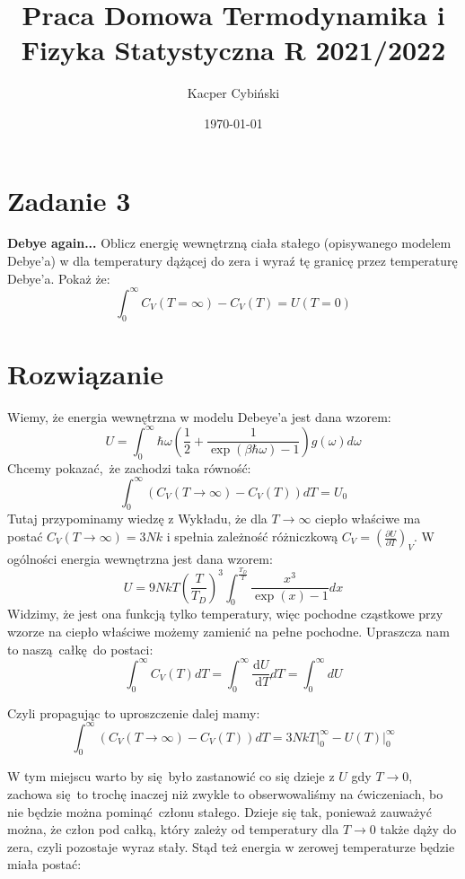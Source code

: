 \documentclass[12pt,a4paper]{article}
\title{Praca Domowa Termodynamika i Fizyka Statystyczna R 2021/2022}
\author{Kacper Cybiński}
\date{\today}
\renewcommand{\emph}{\textbf}
\begin{document}
\maketitle

\section{Zadanie 3}

\emph{Debye again...} Oblicz energię wewnętrzną ciała stałego (opisywanego modelem Debye'a) w dla temperatury dążącej do zera i wyraź tę granicę przez temperaturę Debye'a. Pokaż że:
$$
\int_{0}^{\infty} C_{V}(T=\infty)-C_{V}(T)=U(T=0)
$$

\section{Rozwiązanie}

Wiemy, że energia wewnętrzna w modelu Debeye'a jest dana wzorem:
$$
U=\int_{0}^{\infty} \hbar \omega\left(\frac{1}{2}+\frac{1}{\exp (\beta \hbar \omega)-1}\right) g(\omega) d \omega
$$
Chcemy pokazać, że zachodzi taka równość:
$$
\int_{0}^{\infty}\left(C_{V}(T \rightarrow \infty)-C_{V}(T)\right) d T=U_{0}
$$
Tutaj przypominamy wiedzę z Wykładu, że dla $T \rightarrow \infty$ ciepło właściwe ma postać 
$
C_{V}(T \rightarrow \infty)=3 N k
$ i spełnia zależność różniczkową 
$
C_{V}=\left(\frac{\partial U}{\partial T}\right)_{V}
$.
W ogólności energia wewnętrzna jest dana wzorem:
$$
U=9 N k T\left(\frac{T}{T_{D}}\right)^{3} \int_{0}^{\frac{T_{D}}{T}} \frac{x^{3}}{\exp (x)-1} d x
$$
Widzimy, że jest ona funkcją tylko temperatury, więc pochodne cząstkowe przy wzorze na ciepło właściwe możemy zamienić na pełne pochodne. Upraszcza nam to naszą całkę do postaci:
$$
\int_{0}^{\infty} C_{V}(T) d T=\int_{0}^{\infty} \frac{\mathrm{d} U}{\mathrm{~d} T} d T=\int_{0}^{\infty} d U
$$

Czyli propagując to uproszczenie dalej mamy:
$$
\int_{0}^{\infty}\left(C_{V}(T \rightarrow \infty)-C_{V}(T)\right) d T=\left.3 N k T\right|_{0} ^{\infty}-\left.U(T)\right|_{0} ^{\infty}
$$

W tym miejscu warto by się było zastanowić co się dzieje z $U$ gdy $T \to 0$, zachowa się to trochę inaczej niż zwykle to obserwowaliśmy na ćwiczeniach, bo nie będzie można pominąć członu stałego.
Dzieje się tak, ponieważ zauważyć można, że człon pod całką, który zależy od temperatury dla $T \rightarrow 0$ także dąży do zera, czyli pozostaje wyraz stały. Stąd też energia w zerowej temperaturze będzie miała postać:
\end{document}
